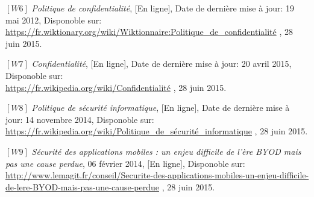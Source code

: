 \vspace{8pt}
\paragraphmark

\noindent $[W6]$ \hspace{2pt} \textit{Politique de confidentialité}, [En ligne], Date de dernière mise à jour: 19 mai 2012, Disponoble sur: \\
\scriptsize{\underline{https://fr.wiktionary.org/wiki/Wiktionnaire:Politique\_de\_confidentialité}} \footnotesize, 28 juin 2015.

\vspace{8pt}
\paragraphmark

\noindent $[W7]$ \hspace{2pt} \textit{Confidentialité}, [En ligne], Date de dernière mise à jour: 20 avril 2015, Disponoble sur: \\
\scriptsize{\underline{https://fr.wikipedia.org/wiki/Confidentialité}} \footnotesize, 28 juin 2015.

\vspace{8pt}
\paragraphmark

\noindent $[W8]$ \hspace{2pt} \textit{Politique de sécurité informatique}, [En ligne], Date de dernière mise à jour: 14 novembre 2014, Disponoble sur: 
\scriptsize{\underline{https://fr.wikipedia.org/wiki/Politique\_de\_sécurité\_informatique}} \footnotesize, 28 juin 2015.

\vspace{8pt}
\paragraphmark

\noindent $[W9]$ \hspace{2pt} \textit{Sécurité des applications mobiles : un enjeu difficile de l'ère BYOD mais pas une cause perdue},  06 février 2014, [En ligne], Disponoble sur: \\
\scriptsize{\underline{http://www.lemagit.fr/conseil/Securite-des-applications-mobiles-un-enjeu-difficile-de-lere-BYOD-mais-pas-une-cause-perdue}} \footnotesize, 28 juin 2015.
